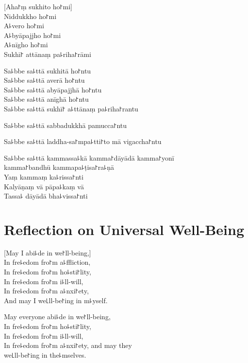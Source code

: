 
\begin{leader}
\end{leader}

[Aha꜓ṃ sukhito ho꜓mi]\\
Niddukkho ho꜓mi\\
A꜕vero ho꜓mi\\
A꜕byāpajjho ho꜓mi\\
A꜕nīgho ho꜓mi\\
Sukhī꜓ attānaṃ pa꜕riha꜓rāmi

Sa꜕bbe sa꜕ttā sukhitā ho꜓ntu\\
Sa꜕bbe sa꜕ttā averā ho꜓ntu\\
Sa꜕bbe sa꜕ttā abyāpajjhā ho꜓ntu\\
Sa꜕bbe sa꜕ttā anīghā ho꜓ntu\\
Sa꜕bbe sa꜕ttā sukhī꜓ a꜕ttānaṃ pa꜕riha꜓rantu

Sa꜕bbe sa꜕ttā sabbadukkhā pamucca꜓ntu

Sa꜕bbe sa꜕ttā laddha-sa꜓mpa꜕tti꜓to mā vigaccha꜓ntu

Sa꜕bbe sa꜕ttā kammassa꜕kā kamma꜓dāyādā kamma꜓yonī\\
\vin kamma꜓bandhū kammapa꜕ṭisa꜓ra꜕ṇā\\
Yaṃ kammaṃ ka꜕rissa꜓nti\\
Kalyāṇaṃ vā pāpa꜕kaṃ vā\\
Tassa꜕ dāyādā bha꜕vissa꜓nti

\chapter[Universal Well-Being]{Reflection on Universal Well-Being}%


\begin{leader}
\end{leader}

[May I abi꜕de in we꜓ll-being,]\\
In fre꜕edom fro꜓m a꜕ffliction,\\
In fre꜕edom fro꜓m ho꜕sti꜓lity,\\
In fre꜕edom fro꜓m i꜕ll-will,\\
In fre꜕edom fro꜓m a꜕nxi꜓ety,\\
And may I  we꜖ll-be꜓ing in m꜕yself.

May everyone abi꜕de in we꜓ll-being,\\
In fre꜕edom fro꜓m ho꜕sti꜓lity,\\
In fre꜕edom fro꜓m i꜕ll-will,\\
In fre꜕edom fro꜓m a꜕nxi꜓ety, and may they\\
 we꜖ll-be꜓ing in the꜕mselves.

